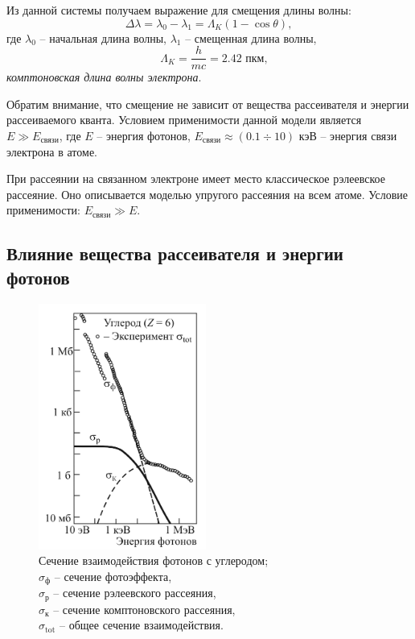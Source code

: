 \documentclass[12pt,a4paper]{article}
\begin{document}
	Из данной системы получаем выражение для смещения длины волны:
	\begin{equation}
		\Delta \lambda = \lambda_0 - \lambda_1 = \Lambda_K (1 - \cos \theta),
		\label{eq:shift_lambda}
	\end{equation}
	где $\lambda_0$ -- начальная длина волны, $\lambda_1$ -- смещенная длина волны,
	$$ \quad \Lambda_K = \frac{h}{mc} = 2.42 \text{ пкм}, $$
	\textit{комптоновская длина волны электрона}.
	
	Обратим внимание, что смещение не зависит от вещества рассеивателя и энергии рассеиваемого кванта. Условием применимости данной модели является $E \gg E_{\text{связи}}$, где $E$ -- энергия фотонов, $E_{\text{связи}} \approx (0.1 \div 10) \text{ кэВ}$ -- энергия связи электрона в атоме.
	
	При рассеянии на связанном электроне имеет место классическое рэлеевское рассеяние. Оно описывается моделью упругого рассеяния на всем атоме. Условие применимости: $E_{\text{связи}} \gg E$.
	
	\subsection*{Влияние вещества рассеивателя и энергии фотонов}
	
	\begin{figure}
		\caption{Сечение взаимодействия фотонов с углеродом; \\
				 $\sigma_{\text{ф}}$ -- сечение фотоэффекта, \\
				 $\sigma_{\text{р}}$ -- сечение рэлеевского рассеяния, \\
				 $\sigma_{\text{к}}$ -- сечение комптоновского рассеяния, \\
				 $\sigma_{\text{tot}}$ -- общее сечение взаимодействия.
				 }
		\label{fig:cross_section}
		\includegraphics[width=5.5cm]{res/cross_section.png}
		\vspace{-10pt}
	\end{figure} 
	
\end{document}
